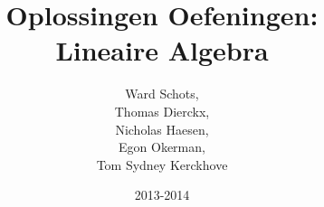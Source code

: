 \documentclass[a4paper]{article}
\title{Oplossingen Oefeningen:\\Lineaire Algebra}
\author{
Ward Schots,\\
Thomas Dierckx,\\
Nicholas Haesen,\\
Egon Okerman,\\
Tom Sydney Kerckhove}
\date{2013-2014}
\begin{document}
\begin{titlepage}
\maketitle
\end{titlepage}
\tableofcontents
\pagebreak










\end{document}
